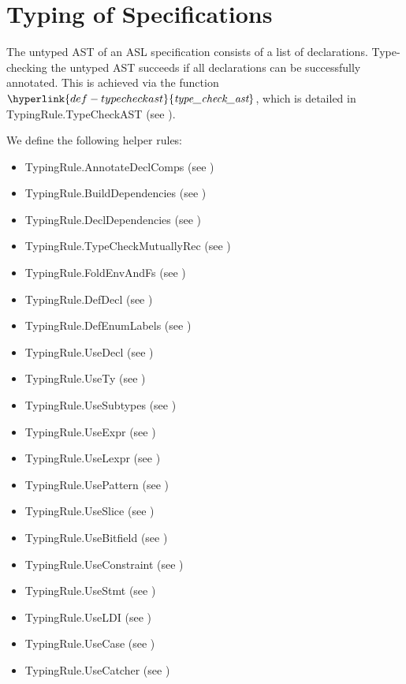 \documentclass{book}
\newcommand\typecheckast[0]{\hyperlink{def-typecheckast}{\textfunc{type\_check\_ast}}}
\begin{document}
\chapter{Typing of Specifications}

The untyped AST of an ASL specification consists of a list of declarations.
Type-checking the untyped AST succeeds if all declarations can be successfully annotated.
This is achieved via the function $\typecheckast$, which is detailed in
TypingRule.TypeCheckAST (see ).

We define the following helper rules:
\begin{itemize}
  \item TypingRule.AnnotateDeclComps (see )
  \item TypingRule.BuildDependencies (see )
  \item TypingRule.DeclDependencies (see )
  \item TypingRule.TypeCheckMutuallyRec (see )
  \item TypingRule.FoldEnvAndFs (see )
  \item TypingRule.DefDecl (see )
  \item TypingRule.DefEnumLabels (see )
  \item TypingRule.UseDecl (see )
  \item TypingRule.UseTy (see )
  \item TypingRule.UseSubtypes (see )
  \item TypingRule.UseExpr (see )
  \item TypingRule.UseLexpr (see )
  \item TypingRule.UsePattern (see )
  \item TypingRule.UseSlice (see )
  \item TypingRule.UseBitfield (see )
  \item TypingRule.UseConstraint (see )
  \item TypingRule.UseStmt (see )
  \item TypingRule.UseLDI (see )
  \item TypingRule.UseCase (see )
  \item TypingRule.UseCatcher (see )
\end{itemize}
\end{document}
